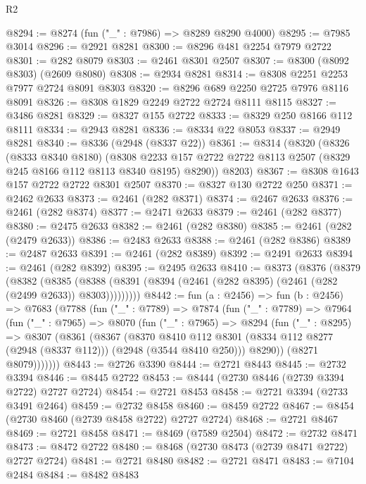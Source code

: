 \begin{lexlean}{R2}
\begin{coremodule}
@8294 := @8274 (fun ("_" : @7986) => @8289 @8290 @4000)
@8295 := @7985 @3014
@8296 := @2921 @8281
@8300 := @8296 @481 @2254 @7979 @2722
@8301 := @282 @8079
@8303 := @2461 @8301 @2507
@8307 := @8300 (@8092 @8303) (@2609 @8080)
@8308 := @2934 @8281
@8314 := @8308 @2251 @2253 @7977 @2724 @8091 @8303
@8320 := @8296 @689 @2250 @2725 @7976 @8116 @8091
@8326 := @8308 @1829 @2249 @2722 @2724 @8111 @8115
@8327 := @3486 @8281
@8329 := @8327 @155 @2722
@8333 := @8329 @250 @8166 @112 @8111
@8334 := @2943 @8281
@8336 := @8334 @22 @8053
@8337 := @2949 @8281
@8340 := @8336 (@2948 (@8337 @22))
@8361 := @8314
    (@8320
      (@8326
        (@8333 @8340 @8180)
        (@8308 @2233 @157 @2722 @2722 @8113 @2507 (@8329 @245 @8166 @112 @8113 @8340 @8195) @8290))
      @8203)
@8367 := @8308 @1643 @157 @2722 @2722 @8301 @2507
@8370 := @8327 @130 @2722 @250
@8371 := @2462 @2633
@8373 := @2461 (@282 @8371)
@8374 := @2467 @2633
@8376 := @2461 (@282 @8374)
@8377 := @2471 @2633
@8379 := @2461 (@282 @8377)
@8380 := @2475 @2633
@8382 := @2461 (@282 @8380)
@8385 := @2461 (@282 (@2479 @2633))
@8386 := @2483 @2633
@8388 := @2461 (@282 @8386)
@8389 := @2487 @2633
@8391 := @2461 (@282 @8389)
@8392 := @2491 @2633
@8394 := @2461 (@282 @8392)
@8395 := @2495 @2633
@8410 := @8373
    (@8376
      (@8379
        (@8382
          (@8385 (@8388 (@8391 (@8394 (@2461 (@282 @8395) (@2461 (@282 (@2499 @2633)) @8303)))))))))
@8442 := fun (a : @2456) =>
  fun (b : @2456) =>
  @7683
    (@7788
      (fun ("_" : @7789) =>
      @7874
        (fun ("_" : @7789) =>
        @7964
          (fun ("_" : @7965) =>
          @8070
            (fun ("_" : @7965) =>
            @8294
              (fun ("_" : @8295) =>
              @8307
                (@8361
                  (@8367
                    (@8370
                      @8410
                      @112
                      @8301
                      (@8334 @112 @8277 (@2948 (@8337 @112)))
                      (@2948 (@3544 @8410 @250)))
                    @8290))
                (@8271 @8079)))))))
@8443 := @2726 @3390
@8444 := @2721 @8443
@8445 := @2732 @3394
@8446 := @8445 @2722
@8453 := @8444 (@2730 @8446 (@2739 @3394 @2722) @2727 @2724)
@8454 := @2721 @8453
@8458 := @2721 @3394 (@2733 @3491 @2464)
@8459 := @2732 @8458
@8460 := @8459 @2722
@8467 := @8454 (@2730 @8460 (@2739 @8458 @2722) @2727 @2724)
@8468 := @2721 @8467
@8469 := @2721 @8458
@8471 := @8469 (@7589 @2504)
@8472 := @2732 @8471
@8473 := @8472 @2722
@8480 := @8468 (@2730 @8473 (@2739 @8471 @2722) @2727 @2724)
@8481 := @2721 @8480
@8482 := @2721 @8471
@8483 := @7104 @2484
@8484 := @8482 @8483

\end{coremodule}
\end{lexlean}
